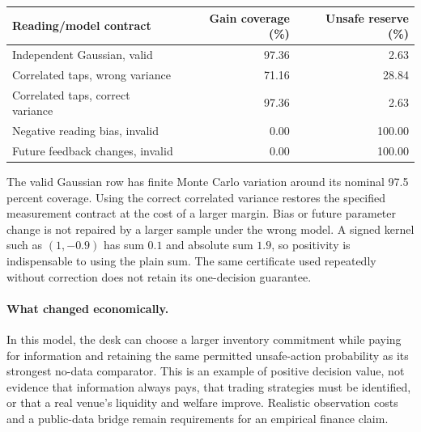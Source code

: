 \documentclass[12pt]{article}
\theoremstyle{definition}
\theoremstyle{remark}
\begin{document}
\begin{center}\footnotesize\begin{tabular}{p{}rr}
\toprule
Reading/model contract & Gain coverage (\%) & Unsafe reserve (\%)\\
\midrule
Independent Gaussian, valid & 97.36 & 2.63\\
Correlated taps, wrong variance & 71.16 & 28.84\\
Correlated taps, correct variance & 97.36 & 2.63\\
Negative reading bias, invalid & 0.00 & 100.00\\
Future feedback changes, invalid & 0.00 & 100.00\\
\bottomrule\end{tabular}\end{center}
The valid Gaussian row has finite Monte Carlo variation around its nominal
97.5 percent coverage. Using the correct correlated variance restores the
specified measurement contract at the cost of a larger margin. Bias or
future parameter change is not repaired by a larger sample under the wrong
model. A signed kernel such as $(1,-0.9)$ has sum $0.1$ and absolute sum
$1.9$, so positivity is indispensable to using the plain sum. The same
certificate used repeatedly without correction does not retain its
one-decision guarantee.

\paragraph{What changed economically.}
In this model, the desk can choose a larger inventory commitment while
paying for information and retaining the same permitted unsafe-action
probability as its strongest no-data comparator. This is an example of
positive decision value, not evidence that information always pays, that
trading strategies must be identified, or that a real venue's liquidity and
welfare improve. Realistic observation costs and a public-data bridge remain
requirements for an empirical finance claim.





\end{document}
